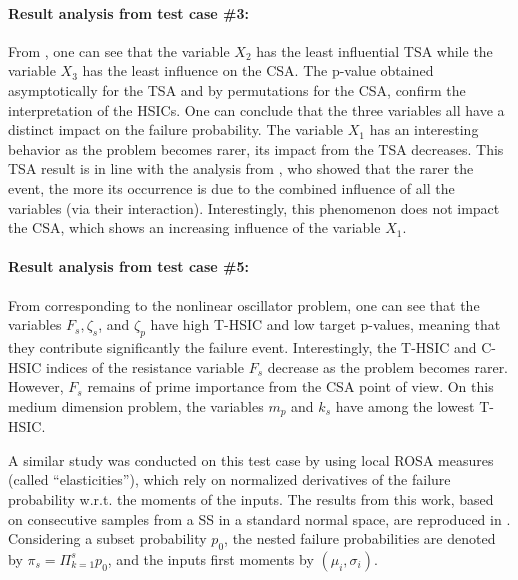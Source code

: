 \paragraph{Result analysis from test case \#3:}

From , one can see that the variable $X_2$ has the least influential TSA while the variable $X_3$ has the least influence on the CSA. 
The p-value obtained asymptotically for the TSA and by permutations for the CSA, confirm the interpretation of the HSICs. 
One can conclude that the three variables all have a distinct impact on the failure probability. 
The variable $X_1$ has an interesting behavior as the problem becomes rarer, its impact from the TSA decreases.      
This TSA result is in line with the analysis from \citet{lemaitre_2015_PLI}, who showed that the rarer the event, the more its occurrence is due to the combined influence of all the variables (via their interaction). 
Interestingly, this phenomenon does not impact the CSA, which shows an increasing influence of the variable $X_1$. 


\paragraph{Result analysis from test case \#5:}
From  corresponding to the nonlinear oscillator problem, one can see that the variables $F_s, \zeta_s$, and $\zeta_p$ have high T-HSIC and low target p-values, meaning that they contribute significantly the failure event.    
Interestingly, the T-HSIC and C-HSIC indices of the resistance variable $F_s$ decrease as the problem becomes rarer. 
However, $F_s$ remains of prime importance from the CSA point of view. 
On this medium dimension problem, the variables $m_p$ and $k_s$ have among the lowest T-HSIC. 

A similar study was conducted on this test case by \citet[Subsec. I-4.3.2]{bourinet_2018} using local ROSA measures (called ``elasticities''), which rely on normalized derivatives of the failure probability w.r.t. the moments of the inputs. 
The results from this work, based on consecutive samples from a SS in a standard normal space, are reproduced in . 
Considering a subset probability $p_0$, the nested failure probabilities are denoted by $\pi_s = \Pi_{k=1}^s p_0$, and the inputs first moments by $(\mu_i, \sigma_i)$. 

